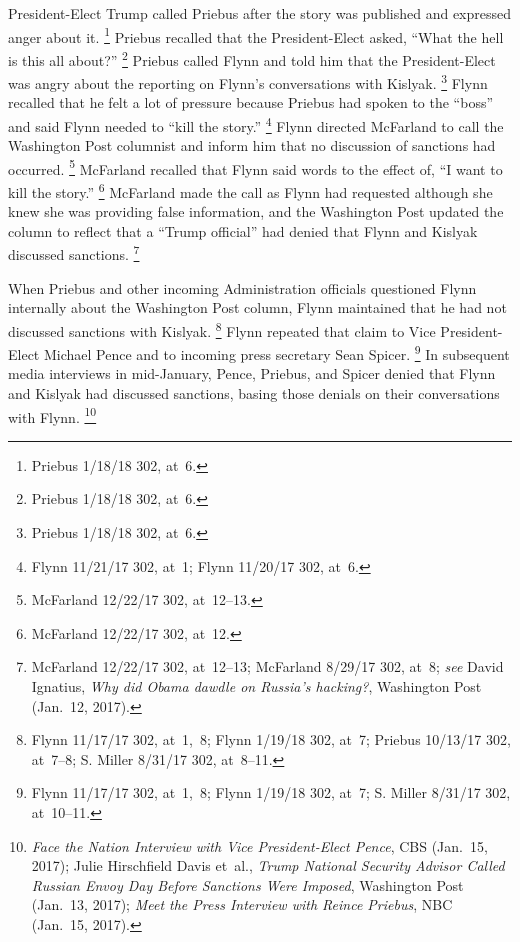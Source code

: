 President-Elect Trump called Priebus after the story was published and expressed anger about it.%
\footnote{Priebus 1/18/18 302, at~6.}
Priebus recalled that the President-Elect asked, ``What the hell is this all about?''%
\footnote{Priebus 1/18/18 302, at~6.}
Priebus called Flynn and told him that the President-Elect was angry about the reporting on Flynn's conversations with Kislyak.%
\footnote{Priebus 1/18/18 302, at~6.}
Flynn recalled that he felt a lot of pressure because Priebus had spoken to the ``boss'' and said Flynn needed to ``kill the story.''%
\footnote{Flynn 11/21/17 302, at~1;
Flynn 11/20/17 302, at~6.}
Flynn directed McFarland to call the Washington Post columnist and inform him that no discussion of sanctions had occurred.%
\footnote{McFarland 12/22/17 302, at~12--13.}
McFarland recalled that Flynn said words to the effect of, ``I want to kill the story.''%
\footnote{McFarland 12/22/17 302, at~12.}
McFarland made the call as Flynn had requested although she knew she was providing false information, and the Washington Post updated the column to reflect that a ``Trump official'' had denied that Flynn and Kislyak discussed sanctions.%
\footnote{McFarland 12/22/17 302, at~12--13;
McFarland 8/29/17 302, at~8;
\textit{see} David Ignatius, \textit{Why did Obama dawdle on Russia's hacking?}, Washington Post (Jan.~12, 2017).}

When Priebus and other incoming Administration officials questioned Flynn internally about the Washington Post column, Flynn maintained that he had not discussed sanctions with Kislyak.%
\footnote{Flynn 11/17/17 302, at~1,~8;
Flynn 1/19/18 302, at~7;
Priebus 10/13/17 302, at~7--8;
S. Miller 8/31/17 302, at~8--11.}
Flynn repeated that claim to Vice President-Elect Michael Pence and to incoming press secretary Sean Spicer.%
\footnote{Flynn 11/17/17 302, at~1,~8;
Flynn 1/19/18 302, at~7;
S. Miller 8/31/17 302, at~10--11.}
In subsequent media interviews in mid-January, Pence, Priebus, and Spicer denied that Flynn and Kislyak had discussed sanctions, basing those denials on their conversations with Flynn.%
\footnote{\textit{Face the Nation Interview with Vice President-Elect Pence}, CBS (Jan.~15, 2017);
Julie Hirschfield Davis et~al., \textit{Trump National Security Advisor Called Russian Envoy Day Before Sanctions Were Imposed}, Washington Post (Jan.~13, 2017);
\textit{Meet the Press Interview with Reince Priebus}, NBC (Jan.~15, 2017).}

